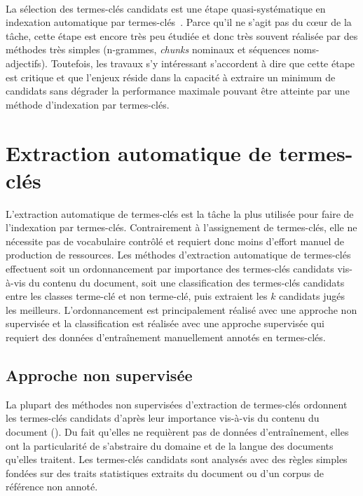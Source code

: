     ~\\La sélection des termes-clés candidats est une étape quasi-systématique
    en indexation automatique par termes-clés~\cite{hasan2014state_of_the_art}.
    Parce qu'il ne s'agit pas du c\oe{}ur de la tâche, cette étape est encore
    très peu étudiée et donc très souvent réalisée par des méthodes très simples
    (n-grammes, \textit{chunks} nominaux et séquences noms-adjectifs).
    Toutefois, les travaux s'y intéressant s'accordent à dire que cette étape
    est critique et que l'enjeux réside dans la capacité à extraire un minimum
    de candidats sans dégrader la performance maximale pouvant être atteinte par
    une méthode d'indexation par termes-clés.


  \section{Extraction automatique de termes-clés}
  \label{sec:main-state_of_the_art-automatic_keyphrase_extraction}
    L'extraction automatique de termes-clés est la tâche la plus utilisée pour
    faire de l'indexation par termes-clés. Contrairement à l'assignement de
    termes-clés, elle ne nécessite pas de vocabulaire contrôlé et requiert donc
    moins d'effort manuel de production de ressources. Les méthodes d'extraction
    automatique de termes-clés effectuent soit un ordonnancement par importance
    des termes-clés candidats vis-à-vis du contenu du document, soit une
    classification des termes-clés candidats entre les classes
    \og{}terme-clé\fg{} et \og{}non terme-clé\fg{}, puis extraient les $k$
    candidats jugés les meilleurs. L'ordonnancement est principalement réalisé
    avec une approche non supervisée et la classification est réalisée avec une
    approche supervisée qui requiert des données d'entraînement manuellement
    annotés en termes-clés.

    \subsection{Approche non supervisée}
    \label{subsec:main-state_of_the_art-automatic_keyphrase_extraction-unsupervised_keyphrase_extraction}
      La plupart des méthodes non supervisées d'extraction de termes-clés
      ordonnent les termes-clés candidats d'après leur importance vis-à-vis du
      contenu du document (). Du fait qu'elles
      ne requièrent pas de données d'entraînement, elles ont la particularité de
      s'abstraire du domaine et de la langue des documents qu'elles traitent.
      Les termes-clés candidats sont analysés avec des règles simples fondées
      sur des traits statistiques extraits du document ou d'un corpus de
      référence non annoté.

